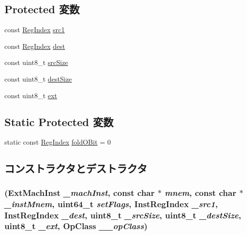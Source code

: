 \subsection*{Protected 変数}
\begin{DoxyCompactItemize}
\item 
const \hyperlink{classStaticInst_a36d25e03e43fa3bb4c5482cbefe5e0fb}{RegIndex} \hyperlink{classX86ISA_1_1MediaOpBase_ac0ec0327e65bf2376ccab1d826a7094e}{src1}
\item 
const \hyperlink{classStaticInst_a36d25e03e43fa3bb4c5482cbefe5e0fb}{RegIndex} \hyperlink{classX86ISA_1_1MediaOpBase_ab74217a19b7ae8f204175991a8087f1e}{dest}
\item 
const uint8\_\-t \hyperlink{classX86ISA_1_1MediaOpBase_ae7efdf20ab0a6d4aac72876a408f86bb}{srcSize}
\item 
const uint8\_\-t \hyperlink{classX86ISA_1_1MediaOpBase_a35da190aef4ec54b8fe6646ce1f6fa15}{destSize}
\item 
const uint8\_\-t \hyperlink{classX86ISA_1_1MediaOpBase_a3bc623a5fbc131bde665a42114f3bc13}{ext}
\end{DoxyCompactItemize}
\subsection*{Static Protected 変数}
\begin{DoxyCompactItemize}
\item 
static const \hyperlink{classStaticInst_a36d25e03e43fa3bb4c5482cbefe5e0fb}{RegIndex} \hyperlink{classX86ISA_1_1MediaOpBase_a917f1040693de798bca0ef27c390f374}{foldOBit} = 0
\end{DoxyCompactItemize}


\subsection{コンストラクタとデストラクタ}
\hypertarget{classX86ISA_1_1MediaOpBase_a9dcb49788dc434343436068f657df37e}{
\subsubsection[{MediaOpBase}]{ ({\bf ExtMachInst} {\em \_\-machInst}, \/  const char $\ast$ {\em mnem}, \/  const char $\ast$ {\em \_\-instMnem}, \/  uint64\_\-t {\em setFlags}, \/  {\bf InstRegIndex} {\em \_\-src1}, \/  {\bf InstRegIndex} {\em \_\-dest}, \/  uint8\_\-t {\em \_\-srcSize}, \/  uint8\_\-t {\em \_\-destSize}, \/  uint8\_\-t {\em \_\-ext}, \/  OpClass {\em \_\-\_\-opClass})}}
\label{classX86ISA_1_1MediaOpBase_a9dcb49788dc434343436068f657df37e}



